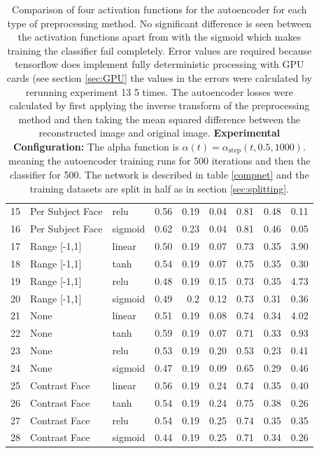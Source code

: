 \begin{table}[!h]
{\begin{tabular}{lllrrrrrr}
         15&Per Subject Face  & relu   &    0.56 &   0.19 &     0.04 &    0.81 &   0.48 &     0.11 \\
         16& Per Subject Face      & sigmoid &    0.62 &   0.23 &     0.04 &    0.81 &   0.46 &     0.05 \\
         \hline
         17&Range [-1,1]      & linear &    0.50 &   0.19 &     0.07 &    0.73 &   0.35 &     3.90 \\
         18&Range [-1,1]      & tanh   &    0.54 &   0.19 &     0.07 &    0.75 &   0.35 &     0.30 \\
         19&Range [-1,1]      & relu   &    0.48 &   0.19 &     0.15 &    0.73 &   0.35 &     4.73 \\
         20& Range [-1,1]      & sigmoid &    0.49 &   0.2  &     0.12 &    0.73 &   0.31 &     0.36 \\
         \hline
         21&None              & linear &    0.51 &   0.19 &     0.08 &    0.74 &   0.34 &     4.02 \\
         22&None              & tanh   &    0.59 &   0.19 &     0.07 &    0.71 &   0.33 &     0.93 \\
         23&None              & relu   &    0.53 &   0.19 &     0.20 &    0.53 &   0.23 &     0.41 \\
         24& None       & sigmoid &    0.47 &   0.19 &     0.09 &    0.65 &   0.29 &     0.46 \\
         \hline
         25&Contrast Face     & linear &    0.56 &   0.19 &     0.24 &    0.74 &   0.35 &     0.40 \\
         26&Contrast Face     & tanh   &    0.54 &   0.19 &     0.24 &    0.75 &   0.38 &     0.26 \\
         27&Contrast Face     & relu   &    0.54 &   0.19 &     0.25 &    0.74 &   0.35 &     0.35 \\
         28& Contrast Face    & sigmoid &    0.44 &   0.19 &     0.25 &    0.71 &   0.34 &     0.26 \\
         \hline
        \end{tabular}
          \caption{Comparison of four activation functions for the autoencoder for each type of preprocessing method.
          No significant difference is seen between the activation functions apart from with the sigmoid
          which makes training the classifier fail completely.
          Error values are required because tensorflow does implement fully deterministic
          processing with GPU cards (see section \ref{sec:GPU} the values in the errors were
          calculated by rerunning experiment 13 5 times. The autoencoder losses were calculated
          by first applying the inverse transform of the preprocessing method and then taking the mean squared
          difference between the reconstructed image and original image. {\bf Experimental Configuration:}
          The alpha function is $\alpha(t)=\alpha_{\text{step}}(t,0.5,1000)$.
          meaning the autoencoder training runs for 500 iterations and then the classifier for 500.
          The network is described in table \ref{compnet} and the training datasets are split in half as in section
          \ref{sec:splitting}.}
      \label{tab:psearch} }
      \end{table}


